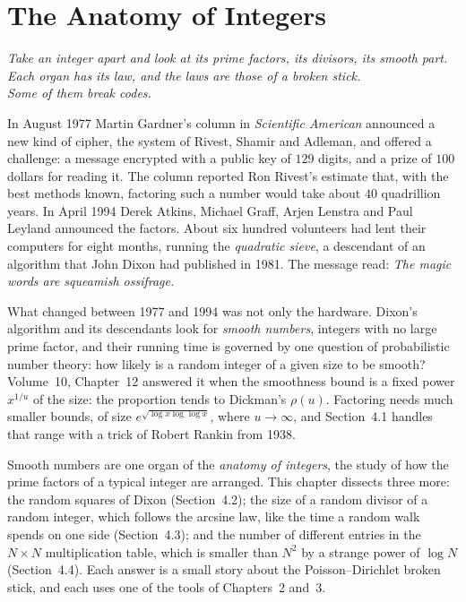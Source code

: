 \chapter{The Anatomy of Integers}\label{ch:anatomy}
\begin{center}\itshape
Take an integer apart and look at its prime factors, its divisors, its smooth part.\\
Each organ has its law, and the laws are those of a broken stick.\\
Some of them break codes.
\end{center}

In August 1977 Martin Gardner's column in \emph{Scientific American} announced a new kind of cipher, the system of Rivest, Shamir and Adleman, and offered a challenge: a message encrypted with a public key of $129$ digits, and a prize of $100$ dollars for reading it. The column reported Ron Rivest's estimate that, with the best methods known, factoring such a number would take about $40$ quadrillion years. In April 1994 Derek Atkins, Michael Graff, Arjen Lenstra and Paul Leyland announced the factors. About six hundred volunteers had lent their computers for eight months, running the \emph{quadratic sieve}, a descendant of an algorithm that John Dixon had published in 1981. The message read: \emph{The magic words are squeamish ossifrage.}

What changed between 1977 and 1994 was not only the hardware. Dixon's algorithm and its descendants look for \emph{smooth numbers}, integers with no large prime factor, and their running time is governed by one question of probabilistic number theory: how likely is a random integer of a given size to be smooth? Volume~10, Chapter~12 answered it when the smoothness bound is a fixed power $x^{1/u}$ of the size: the proportion tends to Dickman's $\rho(u)$. Factoring needs much smaller bounds, of size $e^{\sqrt{\log x\log\log x}}$, where $u\to\infty$, and Section~4.1 handles that range with a trick of Robert Rankin from 1938.

Smooth numbers are one organ of the \emph{anatomy of integers}, the study of how the prime factors of a typical integer are arranged. This chapter dissects three more: the random squares of Dixon (Section~4.2); the size of a random divisor of a random integer, which follows the arcsine law, like the time a random walk spends on one side (Section~4.3); and the number of different entries in the $N\times N$ multiplication table, which is smaller than $N^2$ by a strange power of $\log N$ (Section~4.4). Each answer is a small story about the Poisson--Dirichlet broken stick, and each uses one of the tools of Chapters~2 and~3.

